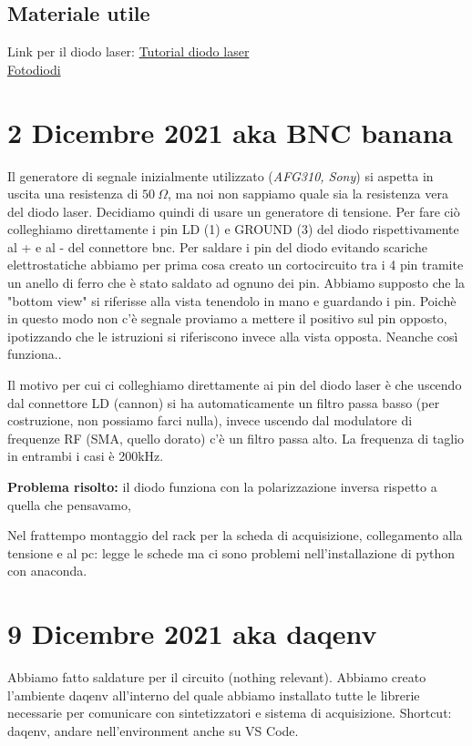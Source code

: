 \documentclass{article}
\numberwithin{equation}{section}
\begin{document}
\subsection{Materiale utile}
Link per il diodo laser:
\href{https://www.thorlabs.com/newgrouppage9.cfm?objectgroup_id=1832}{Tutorial diodo laser}\\
\href{https://www.thorlabs.com/newgrouppage9.cfm?objectgroup_id=285}{Fotodiodi}


\section{2 Dicembre 2021 aka BNC banana}
Il generatore di segnale inizialmente utilizzato (\textit{AFG310, Sony}) si aspetta in uscita una resistenza di $50~\Omega$, ma noi non sappiamo quale sia la resistenza vera del diodo laser. Decidiamo quindi di usare un generatore di tensione.
Per fare ciò colleghiamo direttamente i pin LD (1) e GROUND (3) del diodo rispettivamente al + e al - del connettore bnc. Per saldare i pin del diodo evitando scariche elettrostatiche abbiamo per prima cosa creato un cortocircuito tra i 4 pin tramite un anello di ferro che è stato saldato ad ognuno dei pin. 
Abbiamo supposto che la "bottom view" si riferisse alla vista tenendolo in mano e guardando i pin. Poichè in questo modo non c'è segnale proviamo a mettere il positivo sul pin opposto, ipotizzando che le istruzioni si riferiscono invece alla vista opposta.
Neanche così funziona..

Il motivo per cui ci colleghiamo direttamente ai pin del diodo laser è che uscendo dal connettore LD (cannon) si ha automaticamente un filtro passa basso (per costruzione, non possiamo farci nulla), invece uscendo dal modulatore di frequenze RF (SMA, quello dorato) c'è un filtro passa alto. La frequenza di taglio in entrambi i casi è 200kHz.

\textbf{Problema risolto:} il diodo funziona con la polarizzazione inversa rispetto a quella che pensavamo,

Nel frattempo montaggio del rack per la scheda di acquisizione, collegamento alla tensione e al pc: legge le schede ma ci sono problemi nell'installazione di python con anaconda.


\section{9 Dicembre 2021 aka daqenv}
Abbiamo fatto saldature per il circuito (nothing relevant).
Abbiamo creato l'ambiente daqenv all'interno del quale abbiamo installato tutte le librerie necessarie per comunicare con sintetizzatori e sistema di acquisizione.
Shortcut: daqenv, andare nell'environment anche su VS Code.
\end{document}
